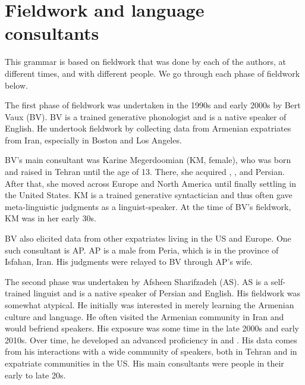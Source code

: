 \section{Fieldwork and language consultants}\label{section: intro: fieldwork}
This grammar is based on fieldwork that was done by each of the authors, at different times, and with different people. We go through each phase of fieldwork below.

The first phase of fieldwork was undertaken in the 1990s and early 2000s by Bert Vaux (BV). BV is a trained generative phonologist and is a native speaker of English.  He undertook fieldwork by collecting data from Armenian expatriates from Iran, especially in    Boston and Los Angeles. 

BV's  main consultant was  Karine Megerdoomian (KM, female), who was born and raised in Tehran   until the age of 13. There, she acquired {\iaIA}, {\seaSEA}, and Persian. After that, she moved  across Europe and North America until finally settling in the United States. KM is a trained generative syntactician and thus often gave meta-linguistic judgments as  a linguist-speaker.  At the time of BV's fieldwork, KM was in her early 30s.  

BV also elicited data from other {\iaIA} expatriates living in the US and Europe. One such consultant is  AP. AP is a male from Peria, which is in the province of Isfahan, Iran. His judgments were relayed to BV through AP's wife. 



The second phase was undertaken by  Afsheen Sharifzadeh (AS). AS is a self-trained linguist and is  a native speaker of Persian and English. His fieldwork was somewhat atypical.  He initially was interested in merely learning the Armenian culture and language.  He often visited the Armenian  community in Iran and would befriend {\iaIA} speakers. His exposure was some time in the late 2000s and early 2010s. Over time, he developed an advanced proficiency in {\seaSEA} and {\iaIA}. His data comes from his interactions with a wide community of {\iaIA} speakers, both in Tehran and in expatriate communities in the US. His main consultants were people in their early to late 20s. 

